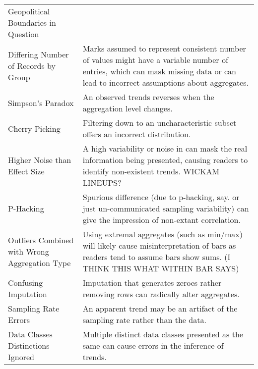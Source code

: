 \begin{table*}[]
\begin{tabular}{p{5cm}p{12cm}}
   \rowcolor{colorb}\multirow{10}{0em}{\hspace{-0.6cm}\rotatebox{90}{\normalsize{Wrangling}}}Geopolitical Boundaries in Question &  \\
 \rowcolor{colorb-opaque}Differing Number of Records by Group & Marks assumed to represent consistent number of values might have a variable number of entries, which can mask missing data or can lead to incorrect assumptions about aggregates. \\
 \rowcolor{colorb}Simpson's Paradox & An observed trends reverses when the aggregation level changes. \cite{guo2017you}\\
 \rowcolor{colorb-opaque}Cherry Picking & Filtering down to an uncharacteristic subset offers an incorrect distribution. \cite{few2019loom}\\
 \rowcolor{colorb}Higher Noise than Effect Size & A high variability or noise in can mask the real information being presented, causing readers to identify non-existent trends. WICKAM LINEUPS?\\
 \rowcolor{colorb-opaque}P-Hacking & Spurious difference (due to p-hacking, say. or just un-communicated sampling variability) can give the impression of non-extant correlation. \cite{pu2018garden}\\
 \rowcolor{colorb}Outliers Combined with Wrong Aggregation Type & Using extremal aggregates (such as min/max) will likely cause misinterpretation of bars as readers tend to assume bars show sums. (I THINK THIS WHAT WITHIN BAR SAYS) \cite{newman2012bar}\\
 \rowcolor{colorb-opaque}Confusing Imputation & Imputation that generates zeroes rather removing rows can radically alter aggregates. \cite{song2018s}\\
 \rowcolor{colorb}Sampling Rate Errors  & An apparent trend may be an artifact of the sampling rate rather than the data. \cite{kindlmann2014algebraic}\\
 \rowcolor{colorb-opaque}Data Classes Distinctions Ignored & Multiple distinct data classes presented as the same can cause errors in the inference of trends. \cite{anand2015automatic}\\


\end{tabular}
\end{table*}
